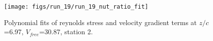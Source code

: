 \begin{figure}[H]
\centering
\texttt{[image: figs/run\_19/run\_19\_nut\_ratio\_fit]}
\caption{Polynomial fits of reynolds stress and velocity gradient terms at $z/c$=6.97, $V_{free}$=30.87, station 2.}
\label{fig:run_19_nut_ratio_fit}
\end{figure}



